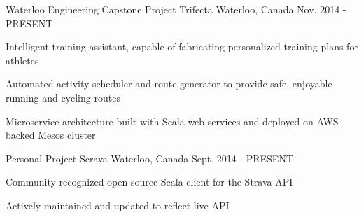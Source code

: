 \begin{cventries}
  \cventry
    {Waterloo Engineering Capstone Project}
    {Trifecta}
    {Waterloo, Canada}
    {Nov. 2014 - PRESENT}
    {
      \begin{cvitems}
        \item {Intelligent training assistant, capable of fabricating personalized training plans for athletes}
        \item {Automated activity scheduler and route generator to provide safe, enjoyable running and cycling routes}
        \item {Microservice architecture built with Scala web services and deployed on AWS-backed Mesos cluster}
      \end{cvitems}
    }
  \cventry
    {Personal Project}
    {Scrava}
    {Waterloo, Canada}
    {Sept. 2014 - PRESENT}
    {
      \begin{cvitems}
        \item {Community recognized open-source Scala client for the Strava API}
        \item {Actively maintained and updated to reflect live API}
      \end{cvitems}
    }
\end{cventries}
